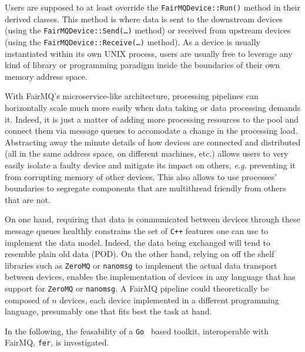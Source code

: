 \documentclass{webofc}
\begin{document}
Users are supposed to at least override the \texttt{FairMQDevice::Run()} method in their derived classes.
This method is where data is sent to the downstream devices (using the \texttt{FairMQDevice::Send(\ldots)} method) or received from upstream devices (using the \texttt{FairMQDevice::Receive(\ldots)} method).
As a device is usually instantiated within its own UNIX process, users are usually free to leverage any kind of library or programming paradigm inside the boundaries of their own memory address space.

With FairMQ's microservice-like architecture, processing pipelines can horizontally scale much more easily when data taking or data processing demands it.
Indeed, it is just a matter of adding more processing resources to the pool and connect them via message queues to accomodate a change in the processing load.
Abstracting away the minute details of how devices are connected and distributed (all in the same address space, on different machines, etc.) allows users to very easily isolate a faulty device and mitigate its impact on others, \emph{e.g.} preventing it from corrupting memory of other devices.
This also allows to use processes' boundaries to segregate components that are multithread friendly from others that are not.

On one hand, requiring that data is communicated between devices through these message queues healthly constrains the set of \texttt{C++} features one can use to implement the data model.
Indeed, the data being exchanged will tend to resemble plain old data (POD).
On the other hand, relying on off the shelf libraries such as \texttt{ZeroMQ} or \texttt{nanomsg} to implement the actual data transport between devices, enables the implementation of devices in any language that has support for \texttt{ZeroMQ} or \texttt{nanomsg}.
A FairMQ pipeline could theoretically be composed of $n$ devices, each device implemented in a different programming language, presumably one that fits best the task at hand.

In the following, the feasability of a \texttt{Go}~\cite{ref-golang} based toolkit, interoperable with FairMQ, \texttt{fer}, is investigated.
\end{document}
